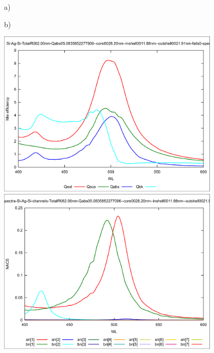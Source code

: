 \documentclass[a4paper]{article}
\begin{document}
\begin{figure}
  \begin{minipage}[h]{0.49\textwidth}    \begin{flushleft}     a)    \end{flushleft}
  \end{minipage}
  \begin{minipage}[h]{0.49\textwidth}    \begin{flushleft}     b)    \end{flushleft}
  \end{minipage}
  \begin{minipage}[h]{0.49\textwidth} 
   \includegraphics[width=0.95\textwidth]{band20-em}
  \end{minipage}
  \begin{minipage}[h]{0.49\textwidth} 
   \includegraphics[width=0.95\textwidth]{band20-em-ch}

\end{minipage}
\end{figure}
\end{document}
